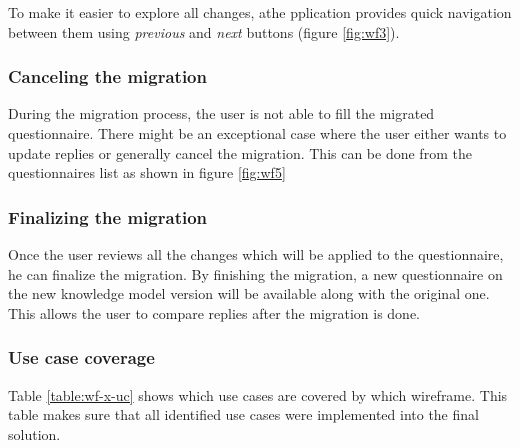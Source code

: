 To make it easier to explore all changes, athe pplication provides quick navigation between them using \textit{previous} and \textit{next} buttons (figure \ref{fig:wf3}).



\subsubsection*{Canceling the migration}

During the migration process, the user is not able to fill the migrated questionnaire.
There might be an exceptional case where the user either wants to update replies or generally cancel the migration.
This can be done from the questionnaires list as shown in figure \ref{fig:wf5}


\subsubsection*{Finalizing the migration}

Once the user reviews all the changes which will be applied to the questionnaire, he can finalize the migration.
By finishing the migration, a new questionnaire on the new knowledge model version will be available along with the original one.
This allows the user to compare replies after the migration is done.


\subsubsection*{Use case coverage}

Table \ref{table:wf-x-uc} shows which use cases are covered by which wireframe.
This table makes sure that all identified use cases were implemented into the final solution.

